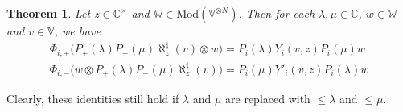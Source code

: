 \documentclass[11pt,b5paper,notitlepage]{article}
\theoremstyle{definition}
\theoremstyle{plain}
\newtheorem{thm}[df]{Theorem}
\newcommand{\Vbb}{\mathbb V}
\newcommand{\Wbb}{\mathbb W}
\newcommand{\Cbb}{\mathbb C}
\newcommand{\<}{\left\langle}
\renewcommand{\>}{\right\rangle}
\newcommand{\Mod}{\mathrm{Mod}}
\numberwithin{equation}{section}
\begin{document}
\begin{thm}\label{lb21}
Let $z\in\Cbb^\times$ and $\Wbb\in\Mod(\Vbb^{\otimes N})$. Then for each $\lambda,\mu\in \Cbb$, $w\in \Wbb$ and $v\in \Vbb$, we have 
\begin{subequations}\label{eq68}
\begin{gather}
\Phi_{i,+}\big(P_+(\lambda)P_-(\mu)\aleph_z^\sharp (v)\otimes w\big) =P_i(\lambda)Y_i(v,z)P_i(\mu)w  \label{eq68a}\\
\Phi_{i,-}\big(w\otimes P_+(\lambda)P_-(\mu)\aleph_z^\sharp (v)\big) =P_i(\mu)Y'_i(v,z)P_i(\lambda)w  \label{eq68b}
\end{gather}
\end{subequations}
\end{thm}

Clearly, these identities still hold if $\lambda$ and $\mu$ are replaced with $\leq\lambda$ and $\leq\mu$.
\end{document}
